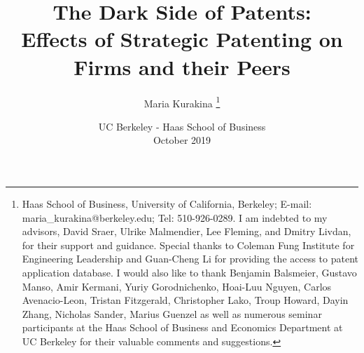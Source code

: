 \documentclass[11pt]{article}
\begin{document}
\onehalfspacing      %

\author{Maria Kurakina  \thanks{\rm Haas
      School of Business, University of California, Berkeley; E-mail: maria\_kurakina@berkeley.edu; 
      Tel: 510-926-0289. I am indebted to my advisors, David Sraer, Ulrike Malmendier, Lee Fleming, and Dmitry Livdan, for their support and guidance. Special thanks to Coleman Fung Institute for Engineering Leadership and Guan-Cheng Li for providing the access to patent application database. I would also like to thank Benjamin Balsmeier, Gustavo Manso, Amir Kermani, Yuriy Gorodnichenko, Hoai-Luu Nguyen, Carlos Avenacio-Leon, Tristan Fitzgerald, Christopher Lako, Troup Howard, Dayin Zhang, Nicholas Sander, Marius Guenzel as well as numerous seminar participants at the Haas School of Business and Economics Department at UC Berkeley for their valuable comments and suggestions.}}

\title{\Large \bf The Dark Side of Patents: \\ Effects of Strategic Patenting on Firms and their Peers}

\date{UC Berkeley - Haas School of Business \\ October 2019}              %


\maketitle
\thispagestyle{empty}

\bigskip
\end{document}
